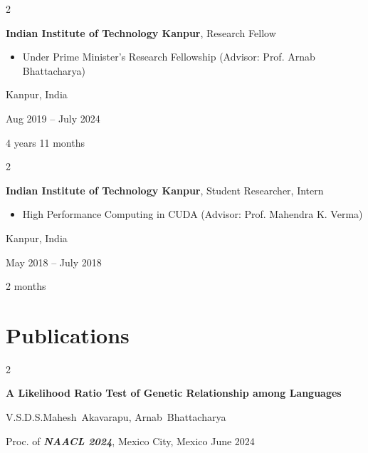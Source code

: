 \documentclass[12pt, letterpaper]{article}
\newenvironment{highlights}{
    \begin{itemize}[
        topsep=0.10 cm,
        parsep=0.10 cm,
        partopsep=0pt,
        itemsep=0pt,
        leftmargin=0.4 cm + 10pt
    ]
}{
    \end{itemize}
} %
\newenvironment{twocolentry}[2][]{
    \onecolentry
    \def\secondColumn{#2}
    \setcolumnwidth{\fill, 4.5 cm}
    \begin{paracol}{2}
}{
    \switchcolumn \raggedleft \secondColumn
    \end{paracol}
    \endonecolentry
} %
\begin{document}
        
        \begin{twocolentry}{
            Kanpur, India

        Aug 2019 – July 2024

        4 years 11 months
        }
            \textbf{Indian Institute of Technology Kanpur}, Research Fellow
            \begin{highlights}
                \item Under Prime Minister's Research Fellowship (Advisor: Prof. Arnab Bhattacharya)
            \end{highlights}
        \end{twocolentry}


        \vspace{0.2 cm}

        \begin{twocolentry}{
            Kanpur, India

        May 2018 – July 2018

        2 months
        }
            \textbf{Indian Institute of Technology Kanpur}, Student Researcher, Intern
            \begin{highlights}
                \item High Performance Computing in CUDA (Advisor: Prof. Mahendra K. Verma)
            \end{highlights}
        \end{twocolentry}



    
    \section{Publications}



        
        \begin{samepage}
            \begin{twocolentry}{
                June 2024
            }
                \textbf{A Likelihood Ratio Test of Genetic Relationship among Languages}

                \vspace{0.10 cm}

                \mbox{V.S.D.S.Mahesh Akavarapu}, \mbox{Arnab Bhattacharya}
                \vspace{0.10 cm}

        Proc. of \textbf{\textit{NAACL 2024}}, Mexico City, Mexico    \end{twocolentry}
        \end{samepage}
\end{document}
